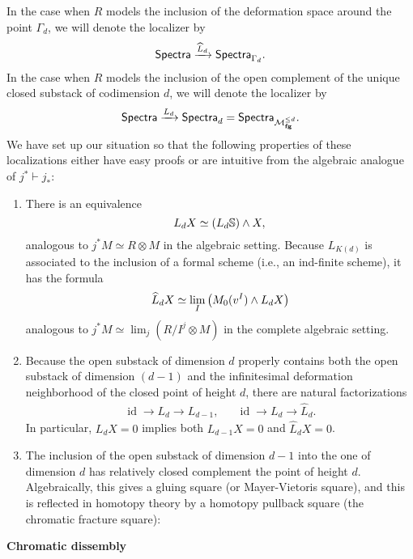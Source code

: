 In the case when $R$ models the inclusion of the deformation space around the point $\Gamma_d$, we will denote the localizer by \[\mathsf{Spectra} \xrightarrow{\widehat L_d} \mathsf{Spectra}_{\Gamma_d}.\]  In the case when $R$ models the inclusion of the open complement of the unique closed substack of codimension $d$, we will denote the localizer by \[\mathsf{Spectra} \xrightarrow{L_d} \mathsf{Spectra}_d = \mathsf{Spectra}_{\mathcal{M}_{\mathbf{fg}}^{\le d}}.\]  We have set up our situation so that the following properties of these localizations either have easy proofs or are intuitive from the algebraic analogue of $j^* \vdash j_*$:
\begin{enumerate}
\item There is an equivalence \[L_d X \simeq (L_d \mathbb S) \wedge X,\] analogous to $j^* M \simeq R \otimes M$ in the algebraic setting.  Because $L_{K(d)}$ is associated to the inclusion of a formal scheme (i.e., an ind-finite scheme), it has the formula \[\widehat L_d X \simeq \lim_I \left( M_0(v^I) \wedge L_d X \right)\] analogous to $j^* M \simeq \lim_j (R/I^j \otimes M)$ in the complete algebraic setting.
\item Because the open substack of dimension $d$ properly contains both the open substack of dimension $(d-1)$ and the infinitesimal deformation neighborhood of the closed point of height $d$, there are natural factorizations
\begin{align*}
\operatorname{id} \to L_d \to L_{d-1}, & & \operatorname{id} \to L_d \to \widehat L_d.
\end{align*}
In particular, $L_d X = 0$ implies both $L_{d-1} X = 0$ and $\widehat L_d X = 0$.
\item The inclusion of the open substack of dimension $d-1$ into the one of dimension $d$ has relatively closed complement the point of height $d$.  Algebraically, this gives a gluing square (or Mayer-Vietoris square), and this is reflected in homotopy theory by a homotopy pullback square (the chromatic fracture square):
\begin{center}
\end{center}
\end{enumerate}


\textbf{Chromatic dissembly}


